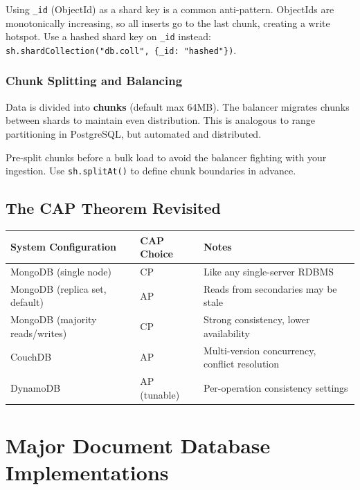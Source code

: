\documentclass[12pt,a4paper]{article}
\begin{document}
\begin{antipattern}
Using \texttt{\_id} (ObjectId) as a shard key is a common anti-pattern. ObjectIds are monotonically increasing, so all inserts go to the last chunk, creating a write hotspot. Use a hashed shard key on \texttt{\_id} instead: \texttt{sh.shardCollection("db.coll", \{\_id: "hashed"\})}.
\end{antipattern}

\subsubsection{Chunk Splitting and Balancing}

Data is divided into \textbf{chunks} (default max 64MB). The balancer migrates chunks between shards to maintain even distribution. This is analogous to range partitioning in PostgreSQL, but automated and distributed.

\begin{tip}
Pre-split chunks before a bulk load to avoid the balancer fighting with your ingestion. Use \texttt{sh.splitAt()} to define chunk boundaries in advance.
\end{tip}

\subsection{The CAP Theorem Revisited}

\begin{center}
\begin{tabular}{@{}lll@{}}
\toprule
\textbf{System Configuration} & \textbf{CAP Choice} & \textbf{Notes} \\
\midrule
MongoDB (single node) & CP & Like any single-server RDBMS \\
MongoDB (replica set, default) & AP & Reads from secondaries may be stale \\
MongoDB (majority reads/writes) & CP & Strong consistency, lower availability \\
CouchDB & AP & Multi-version concurrency, conflict resolution \\
DynamoDB & AP (tunable) & Per-operation consistency settings \\
\bottomrule
\end{tabular}
\end{center}

\section{Major Document Database Implementations}
\end{document}
